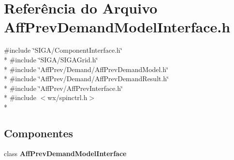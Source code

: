 \section{Referência do Arquivo Aff\+Prev\+Demand\+Model\+Interface.\+h}
\label{_aff_prev_demand_model_interface_8h}
{\ttfamily \#include \char`\"{}S\+I\+G\+A/\+Component\+Interface.\+h\char`\"{}}\\*
{\ttfamily \#include \char`\"{}S\+I\+G\+A/\+S\+I\+G\+A\+Grid.\+h\char`\"{}}\\*
{\ttfamily \#include \char`\"{}Aff\+Prev/\+Demand/\+Aff\+Prev\+Demand\+Model.\+h\char`\"{}}\\*
{\ttfamily \#include \char`\"{}Aff\+Prev/\+Demand/\+Aff\+Prev\+Demand\+Result.\+h\char`\"{}}\\*
{\ttfamily \#include \char`\"{}Aff\+Prev/\+Aff\+Prev\+Interface.\+h\char`\"{}}\\*
{\ttfamily \#include $<$wx/spinctrl.\+h$>$}\\*
\subsection*{Componentes}
\begin{DoxyCompactItemize}
\item 
class {\bf Aff\+Prev\+Demand\+Model\+Interface}
\end{DoxyCompactItemize}

